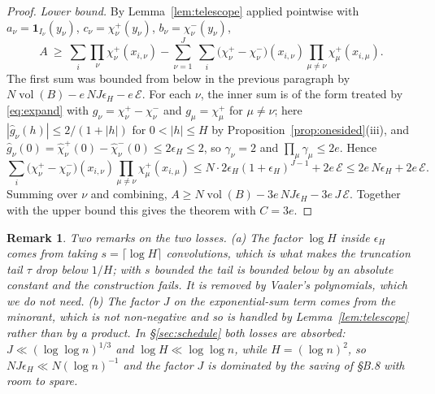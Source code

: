 \documentclass[11pt]{article}
\newtheorem{remark}[theorem]{Remark}
\theoremstyle{definition}
\theoremstyle{plain}
\begin{document}
\begin{proof}
\emph{Lower bound.}  By Lemma~\ref{lem:telescope} applied pointwise with
$a_{\nu}=\mathbf 1_{I_{\nu}}(y_{\nu})$, $c_{\nu}=\chi^{+}_{\nu}(y_{\nu})$,
$b_{\nu}=\chi^{-}_{\nu}(y_{\nu})$,
\[
A\ \ge\ \sum_{i}\prod_{\nu}\chi^{+}_{\nu}(x_{i,\nu})
-\sum_{\nu=1}^{J}\ \sum_{i}\bigl(\chi^{+}_{\nu}-\chi^{-}_{\nu}\bigr)
(x_{i,\nu})\prod_{\mu\ne\nu}\chi^{+}_{\mu}(x_{i,\mu}).
\]
The first sum was bounded from below in the previous paragraph by
$N\operatorname{vol}(B)-e\,NJ\epsilon_{H}-e\,\mathcal E$.  For each
$\nu$, the inner sum is of the form treated by \eqref{eq:expand} with
$g_{\nu}=\chi^{+}_{\nu}-\chi^{-}_{\nu}$ and $g_{\mu}=\chi^{+}_{\mu}$ for
$\mu\ne\nu$; here $|\hat g_{\nu}(h)|\le2/(1+|h|)$ for $0<|h|\le H$ by
Proposition~\ref{prop:onesided}(iii), and
$\hat g_{\nu}(0)=\hat\chi^{+}_{\nu}(0)-\hat\chi^{-}_{\nu}(0)
\le2\epsilon_{H}\le2$, so $\gamma_{\nu}=2$ and
$\prod_{\mu}\gamma_{\mu}\le2e$.  Hence
\[
\sum_{i}\bigl(\chi^{+}_{\nu}-\chi^{-}_{\nu}\bigr)(x_{i,\nu})
\prod_{\mu\ne\nu}\chi^{+}_{\mu}(x_{i,\mu})
\le N\cdot2\epsilon_{H}(1+\epsilon_{H})^{J-1}+2e\,\mathcal E
\le 2e\,N\epsilon_{H}+2e\,\mathcal E .
\]
Summing over $\nu$ and combining,
$A\ge N\operatorname{vol}(B)-3e\,NJ\epsilon_{H}-3e\,J\,\mathcal E$.
Together with the upper bound this gives the theorem with $C=3e$.
\end{proof}

\begin{remark}\label{rem:ETuse}
Two remarks on the two losses.  (a) The factor $\log H$ inside
$\epsilon_{H}$ comes from taking $s=\lceil\log H\rceil$ convolutions, which
is what makes the truncation tail $\tau$ drop below $1/H$; with $s$
bounded the tail is bounded below by an absolute constant and the
construction fails.  It is removed by Vaaler's polynomials, which we do
not need.  (b) The factor $J$ on the exponential-sum term comes from the
minorant, which is not non-negative and so is handled by
Lemma~\ref{lem:telescope} rather than by a product.  In
\S\ref{sec:schedule} both losses are absorbed: $J\ll(\log\log n)^{1/3}$
and $\log H\ll\log\log n$, while $H=(\log n)^{2}$, so
$NJ\epsilon_{H}\ll N(\log n)^{-1}$ and the factor $J$ is dominated by the
saving of \S B.8 with room to spare.
\end{remark}
\end{document}
